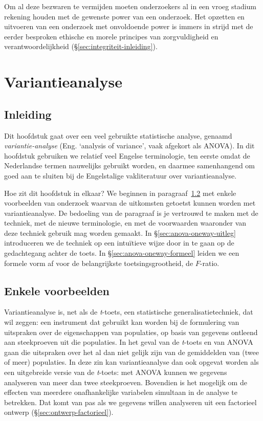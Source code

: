 \documentclass[
]{book}
\begin{document}
Om al deze bezwaren te vermijden moeten onderzoekers al in een vroeg
stadium rekening houden met de gewenste power van een onderzoek. Het
opzetten en uitvoeren van een onderzoek met onvoldoende power is immers
in strijd met de eerder besproken ethische en morele principes van
zorgvuldigheid en verantwoordelijkheid
(§\ref{sec:integriteit-inleiding}).

\hypertarget{ch:variantieanalyse}{%
\chapter{Variantieanalyse}\label{ch:variantieanalyse}}

\hypertarget{sec:inleiding}{%
\section{Inleiding}\label{sec:inleiding}}

Dit hoofdstuk gaat over een veel gebruikte statistische analyse, genaamd
\emph{variantie-analyse} (Eng. `analysis of variance', vaak afgekort als
ANOVA). In dit hoofdstuk gebruiken we relatief veel Engelse
terminologie, ten eerste omdat de Nederlandse termen nauwelijks gebruikt
worden, en daarmee samenhangend om goed aan te sluiten bij de
Engelstalige vakliteratuur over variantieanalyse.

Hoe zit dit hoofdstuk in elkaar? We beginnen in
paragraaf~\ref{sec:anova-voorbeelden} met enkele voorbeelden van onderzoek
waarvan de uitkomsten getoetst kunnen worden met variantieanalyse. De
bedoeling van de paragraaf is je vertrouwd te maken met de techniek, met
de nieuwe terminologie, en met de voorwaarden waaronder van deze
techniek gebruik mag worden gemaakt. In
§\ref{sec:anova-oneway-uitleg} introduceren we de techniek op een
intuïtieve wijze door in te gaan op de gedachtegang achter de toets. In
§\ref{sec:anova-oneway-formeel} leiden we een formele vorm af voor
de belangrijkste toetsingsgrootheid, de \(F\)-ratio.

\hypertarget{sec:anova-voorbeelden}{%
\section{Enkele voorbeelden}\label{sec:anova-voorbeelden}}

Variantieanalyse is, net als de \emph{t}-toets, een statistische
generalisatietechniek, dat wil zeggen: een instrument dat gebruikt kan
worden bij de formulering van uitspraken over de eigenschappen van
populaties, op basis van gegevens ontleend aan steekproeven uit die
populaties. In het geval van de \emph{t}-toets en van ANOVA gaan die uitspraken over
het al dan niet gelijk zijn van de gemiddelden van (twee of meer)
populaties. In deze zin kan variantieanalyse dan ook opgevat worden als
een uitgebreide versie van de \emph{t}-toets: met ANOVA kunnen we gegevens analyseren
van meer dan twee steekproeven. Bovendien is het mogelijk om de effecten
van meerdere onafhankelijke variabelen simultaan in de analyse te
betrekken. Dat komt van pas als we gegevens willen analyseren uit een
factorieel ontwerp (§\ref{sec:ontwerp-factorieel}).
\end{document}
